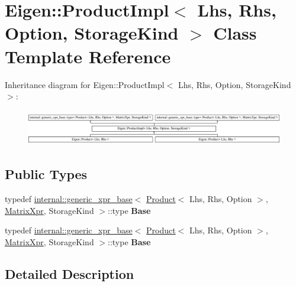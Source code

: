 \hypertarget{class_eigen_1_1_product_impl}{}\section{Eigen\+:\+:Product\+Impl$<$ Lhs, Rhs, Option, Storage\+Kind $>$ Class Template Reference}
\label{class_eigen_1_1_product_impl}
Inheritance diagram for Eigen\+:\+:Product\+Impl$<$ Lhs, Rhs, Option, Storage\+Kind $>$\+:\begin{figure}[H]
\begin{center}
\leavevmode
\includegraphics[height=1.581921cm]{class_eigen_1_1_product_impl}
\end{center}
\end{figure}
\subsection*{Public Types}
\begin{DoxyCompactItemize}
\item 
\mbox{\label{class_eigen_1_1_product_impl_a65c4702671bd83efd4c94df70d504a41}} 
typedef \hyperlink{struct_eigen_1_1internal_1_1generic__xpr__base}{internal\+::generic\+\_\+xpr\+\_\+base}$<$ \hyperlink{group___core___module_class_eigen_1_1_product}{Product}$<$ Lhs, Rhs, Option $>$, \hyperlink{struct_eigen_1_1_matrix_xpr}{Matrix\+Xpr}, Storage\+Kind $>$\+::type {\bfseries Base}
\item 
\mbox{\label{class_eigen_1_1_product_impl_a65c4702671bd83efd4c94df70d504a41}} 
typedef \hyperlink{struct_eigen_1_1internal_1_1generic__xpr__base}{internal\+::generic\+\_\+xpr\+\_\+base}$<$ \hyperlink{group___core___module_class_eigen_1_1_product}{Product}$<$ Lhs, Rhs, Option $>$, \hyperlink{struct_eigen_1_1_matrix_xpr}{Matrix\+Xpr}, Storage\+Kind $>$\+::type {\bfseries Base}
\end{DoxyCompactItemize}


\subsection{Detailed Description}
